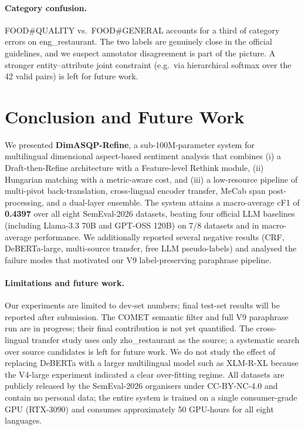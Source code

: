 \documentclass[runningheads]{llncs}
\begin{document}
\paragraph{Category confusion.}
FOOD\#QUALITY vs.\ FOOD\#GENERAL accounts for a third of category
errors on eng\_restaurant. The two labels are genuinely close in the
official guidelines, and we suspect annotator disagreement is part of
the picture. A stronger entity--attribute joint constraint (e.g.\ via
hierarchical softmax over the 42 valid pairs) is left for future
work.

\section{Conclusion and Future Work}
\label{sec:conclusion}

We presented \textbf{DimASQP-Refine}, a sub-100M-parameter system for
multilingual dimensional aspect-based sentiment analysis that combines
(i) a Draft-then-Refine architecture with a Feature-level Rethink
module, (ii) Hungarian matching with a metric-aware cost, and (iii)
a low-resource pipeline of multi-pivot back-translation, cross-lingual
encoder transfer, MeCab span post-processing, and a dual-layer ensemble.
The system attains a macro-average cF1 of \textbf{0.4397} over all
eight SemEval-2026 datasets, beating four official LLM baselines
(including Llama-3.3 70B and GPT-OSS 120B) on $7/8$ datasets and in
macro-average performance. We additionally reported several negative
results (CRF, DeBERTa-large, multi-source transfer, free LLM
pseudo-labels) and analysed the failure modes that motivated our V9
label-preserving paraphrase pipeline.

\paragraph{Limitations and future work.}
Our experiments are limited to dev-set numbers; final test-set
results will be reported after submission. The COMET semantic filter
and full V9 paraphrase run are in progress; their final contribution
is not yet quantified. The cross-lingual transfer study uses only
zho\_restaurant as the source; a systematic search over source
candidates is left for future work. We do not study the effect of
replacing DeBERTa with a larger multilingual model such as XLM-R-XL
because the V4-large experiment indicated a clear over-fitting regime.
All datasets are publicly released by the SemEval-2026 organisers
under CC-BY-NC-4.0 and contain no personal data; the entire system
is trained on a single consumer-grade GPU (RTX-3090) and consumes
approximately 50 GPU-hours for all eight languages.
\end{document}
